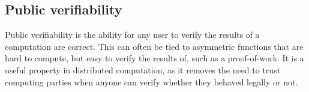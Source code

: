 \subsection{Public verifiability}
Public verifiability is the ability for any user to verify the results of a computation are correct. This can often be tied to asymmetric functions that are hard to compute, but easy to verify the results of, such as a proof-of-work. It is a useful property in distributed computation, as it removes the need to trust computing parties when anyone can verify whether they behaved legally or not. 